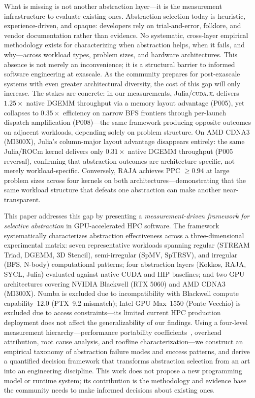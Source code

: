 What is missing is not another abstraction layer---it is the measurement
infrastructure to evaluate existing ones. Abstraction selection today is
heuristic, experience-driven, and opaque: developers rely on trial-and-error,
folklore, and vendor documentation rather than evidence. No systematic,
cross-layer empirical methodology exists for characterizing when abstraction
helps, when it fails, and why---across workload types, problem sizes, and hardware architectures. This absence is not merely an inconvenience; it is
a structural barrier to informed software engineering at exascale. As the
community prepares for post-exascale systems with even greater architectural
diversity, the cost of this gap will only increase. The stakes are concrete: in
our measurements, Julia/\textsc{cuda.jl} delivers $1.25\times$ native DGEMM
throughput via a memory layout advantage (P005), yet collapses to $0.35\times$
efficiency on narrow BFS frontiers through per-launch dispatch amplification
(P008)---the same framework producing opposite outcomes on adjacent workloads,
depending solely on problem structure. On AMD CDNA3 (MI300X), Julia's
column-major layout advantage disappears entirely: the same Julia/ROCm kernel
delivers only $0.31\times$ native DGEMM throughput (P005 reversal), confirming
that abstraction outcomes are architecture-specific, not merely workload-specific.
Conversely, RAJA achieves PPC $\geq 0.94$ at large problem sizes across four
kernels on both architectures---demonstrating that the same workload structure
that defeats one abstraction can make another near-transparent.

This paper addresses this gap by presenting a \emph{measurement-driven
framework for selective abstraction} in GPU-accelerated HPC software. The
framework systematically characterizes abstraction effectiveness across a
three-dimensional experimental matrix: seven representative workloads spanning
regular (STREAM Triad, DGEMM, 3D Stencil), semi-irregular (SpMV, SpTRSV), and
irregular (BFS, N-body) computational patterns; four abstraction layers (Kokkos,
RAJA, SYCL, Julia) evaluated against native CUDA and HIP baselines; and two
GPU architectures covering NVIDIA Blackwell (RTX 5060) and AMD CDNA3 (MI300X).
Numba is excluded due to incompatibility with Blackwell compute capability~12.0
(PTX~9.2 mismatch); Intel GPU Max~1550 (Ponte Vecchio) is excluded due to
access constraints---its limited current HPC production deployment does not
affect the generalizability of our findings.
Using a four-level measurement hierarchy---performance
portability coefficients~\cite{Pennycook2019}, overhead attribution, root cause
analysis, and roofline characterization---we construct an empirical taxonomy of
abstraction failure modes and success patterns, and derive a quantified decision
framework that transforms abstraction selection from an art into an engineering
discipline. This work does not propose a new programming model or runtime
system; its contribution is the methodology and evidence base the community
needs to make informed decisions about existing ones.


